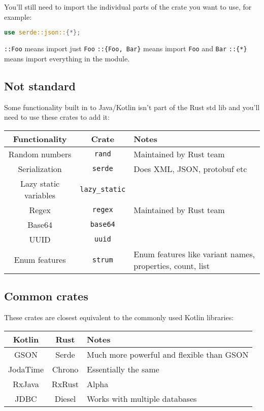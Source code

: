 \documentclass[a4paper,11pt]{article}
\begin{document}
You'll still need to import the individual parts of the crate you want to use, for example:
\begin{lstlisting}[language=Rust,frame=single]
use serde::json::{*};
\end{lstlisting}
\lstinline|::Foo| means import just \lstinline|Foo|
\newline
\lstinline|::{Foo, Bar}| means import \lstinline|Foo| and \lstinline|Bar|
\newline
\lstinline|::{*}| means import everything in the module.

\subsection{Not standard}
Some functionality built in to Java/Kotlin isn't part of the Rust std lib and you'll need to use these crates to add it:

\renewcommand{\arraystretch}{1.3}

\begin{center}
\begin{tabular}{ c|c|l } 

Functionality & Crate & Notes \\ 
\hline
Random numbers & \lstinline|rand| & Maintained by Rust team \\
Serialization & \lstinline|serde| & Does XML, JSON, protobuf etc \\
Lazy static variables & \lstinline|lazy_static| & \\
Regex & \lstinline|regex| & Maintained by Rust team \\
Base64 & \lstinline|base64| & \\
UUID & \lstinline|uuid| & \\
Enum features & \lstinline|strum| & Enum features like variant names, properties, count, list \\
 
\end{tabular}
\end{center}

\subsection{Common crates}
These crates are closest equivalent to the commonly used Kotlin libraries:
\begin{center}
\begin{tabular}{ c|c|l } 
 Kotlin & Rust & Notes \\ 
 \hline
 GSON & Serde & Much more powerful and flexible than GSON \\
 JodaTime & Chrono & Essentially the same \\
 RxJava & RxRust & Alpha \\
 JDBC & Diesel & Works with multiple databases \\
\end{tabular}
\end{center}
\end{document}
